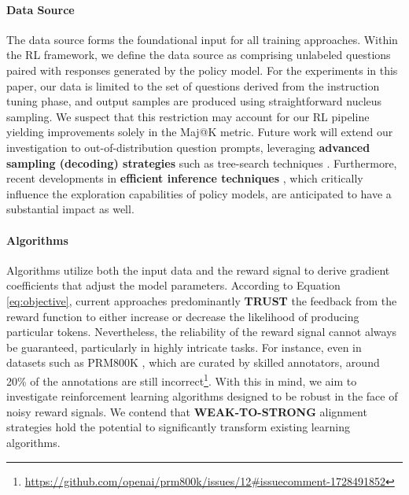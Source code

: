 \begin{itemize}[topsep=0pt]
\paragraph{Data Source} The data source forms the foundational input for all training approaches. Within the RL framework, we define the data source as comprising unlabeled questions paired with responses generated by the policy model. For the experiments in this paper, our data is limited to the set of questions derived from the instruction tuning phase, and output samples are produced using straightforward nucleus sampling. We suspect that this restriction may account for our RL pipeline yielding improvements solely in the Maj@K metric. Future work will extend our investigation to out-of-distribution question prompts, leveraging \textbf{advanced sampling (decoding) strategies} such as tree-search techniques \citep{yao2023tree}. Furthermore, recent developments in \textbf{efficient inference techniques} \citep{xia-etal-2023-speculative,leviathan2023fast,kwon2023efficient,xia2024unlocking}, which critically influence the exploration capabilities of policy models, are anticipated to have a substantial impact as well.

\paragraph{Algorithms} Algorithms utilize both the input data and the reward signal to derive gradient coefficients that adjust the model parameters. According to Equation \ref{eq:objective}, current approaches predominantly \textbf{TRUST} the feedback from the reward function to either increase or decrease the likelihood of producing particular tokens. Nevertheless, the reliability of the reward signal cannot always be guaranteed, particularly in highly intricate tasks. For instance, even in datasets such as PRM800K \citep{lightman2023let}, which are curated by skilled annotators, around 20\% of the annotations are still incorrect\footnote{\url{https://github.com/openai/prm800k/issues/12\#issuecomment-1728491852}}. With this in mind, we aim to investigate reinforcement learning algorithms designed to be robust in the face of noisy reward signals. We contend that \textbf{WEAK-TO-STRONG} \citep{burns2023weak} alignment strategies hold the potential to significantly transform existing learning algorithms.


\end{itemize}
